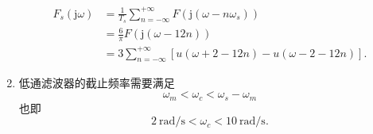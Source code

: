 \begin{exampleprob}
\begin{solution}
\begin{enumerate}
\begin{align*}
                      F_s(\mathrm{j}\omega) & =\frac{1}{T_s}\sum_{n=-\infty}^{+\infty}F(\mathrm{j}(\omega-n\omega_s)) \\
                                            & =\frac{6}{\pi}F(\mathrm{j}(\omega-12n))                                 \\
                                            & =3\sum_{n=-\infty}^{+\infty}[u(\omega+2-12n)-u(\omega-2-12n)].
                  \end{align*}
            \item 低通滤波器的截止频率需要满足
                  \begin{equation*}
                      \omega_m<\omega_c<\omega_s-\omega_m
                  \end{equation*}
                  也即
                  \begin{equation*}
                      2\ \mathrm{rad/s}<\omega_c<10\ \mathrm{rad/s}.
                  \end{equation*}
        \end{enumerate}
    \end{solution}
\end{exampleprob}
